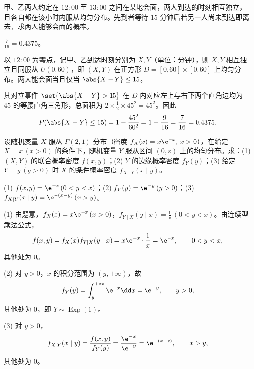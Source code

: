 \begin{exercise}
甲、乙两人约定在 $12:00$ 至 $13:00$ 之间在某地会面，两人到达的时刻相互独立，且各自都在该小时内服从均匀分布。先到者等待 $15$ 分钟后若另一人尚未到达即离去，求两人能够会面的概率。
\begin{answer}
$\frac{7}{16}=0.4375$。
\end{answer}
\begin{solution}
以 $12:00$ 为零点，记甲、乙到达时刻分别为 $X,Y$（单位：分钟），则 $X,Y$ 相互独立且同服从 $U(0,60)$，即 $(X,Y)$ 在正方形 $D=[0,60]\times[0,60]$ 上均匀分布。两人能会面当且仅当 $\abs{X-Y}\le 15$。

其对立事件 $\set{\abs{X-Y}>15}$ 在 $D$ 内对应左上与右下两个直角边均为 $45$ 的等腰直角三角形，总面积为 $2\times\frac{1}{2}\times 45^2=45^2$。因此
\[
  P(\abs{X-Y}\le 15)=1-\frac{45^2}{60^2}=1-\frac{9}{16}=\frac{7}{16}=0.4375.
\]
\end{solution}
\end{exercise}

\begin{exercise}
设随机变量 $X$ 服从 $\Gamma(2,1)$ 分布（密度 $f_X(x)=x\e^{-x},\,x>0$），在给定 $X=x\,(x>0)$ 的条件下，随机变量 $Y$ 服从区间 $(0,x)$ 上的均匀分布。求：(1) $(X,Y)$ 的联合概率密度 $f(x,y)$；(2) $Y$ 的边缘概率密度 $f_Y(y)$；(3) 给定 $Y=y\,(y>0)$ 时 $X$ 的条件概率密度 $f_{X\mid Y}(x\mid y)$。
\begin{answer}
(1) $f(x,y)=\e^{-x}\,(0<y<x)$；(2) $f_Y(y)=\e^{-y}\,(y>0)$；(3) $f_{X\mid Y}(x\mid y)=\e^{-(x-y)}\,(x>y)$。
\end{answer}
\begin{solution}
(1) 由题意，$f_X(x)=x\e^{-x}\,(x>0)$，$f_{Y\mid X}(y\mid x)=\frac{1}{x}\,(0<y<x)$。由连续型乘法公式，
\[
  f(x,y)=f_X(x)f_{Y\mid X}(y\mid x)=x\e^{-x}\cdot\frac{1}{x}=\e^{-x},\qquad 0<y<x,
\]
其他处为 $0$。

(2) 对 $y>0$，$x$ 的积分范围为 $(y,+\infty)$，故
\[
  f_Y(y)=\int_{y}^{+\infty}\e^{-x}\dd x=\e^{-y},\qquad y>0,
\]
其他处为 $0$，即 $Y\sim\operatorname{Exp}(1)$。

(3) 对 $y>0$，
\[
  f_{X\mid Y}(x\mid y)=\frac{f(x,y)}{f_Y(y)}=\frac{\e^{-x}}{\e^{-y}}=\e^{-(x-y)},\qquad x>y,
\]
其他处为 $0$。
\end{solution}
\end{exercise}

